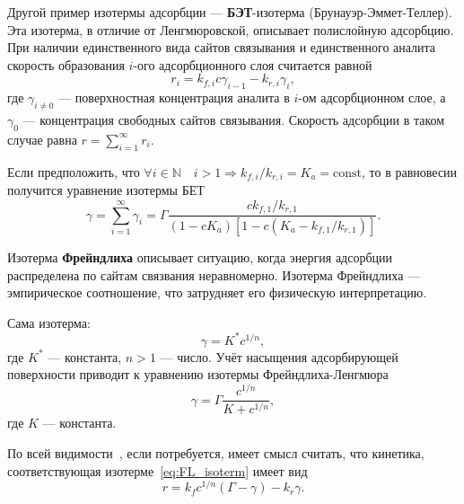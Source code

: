 \documentclass[oneside,final,12pt]{extreport}
\begin{document}

Другой пример изотермы адсорбции ---
\textbf{БЭТ}-изотерма (Брунауэр-Эммет-Теллер).
Эта изотерма, в отличие от Ленгмюровской, описывает полислойную адсорбцию.
При наличии единственного вида сайтов связывания и единственного аналита
скорость образования $i$-ого адсорбционного слоя считается равной
\begin{equation}
  r_i = k_{f,i} c \gamma_{i-1} - k_{r,i} \gamma_{i},
\label{eq:BET_ith_layer_deriv}
\end{equation}
где $\gamma_{i \neq 0}$ --- поверхностная концентрация аналита в
$i$-ом адсорбционном слое, а
$\gamma_0$ --- концентрация свободных сайтов связывания.
Скорость адсорбции в таком случае равна $r = \sum_{i=1}^{\infty} r_i$.

Если предположить, что
$\forall i \in \mathbb{N} \quad i > 1 \Rightarrow
k_{f,i}/k_{r,i} = K_a = \text{const}$,
то в равновесии получится уравнение изотермы БЕТ
\begin{equation}
  \gamma = \sum_{i=1}^{\infty}\gamma_i =
    \Gamma\frac{ck_{f,1}/k_{r,1}}
               {\left(1 - cK_a\right)
                \left[1 - c\left(K_a - k_{f,1}/k_{r,1}\right)\right]}.
\label{eq:BET_isotherm}
\end{equation}

Изотерма \textbf{Фрейндлиха} описывает ситуацию,
когда энергия адсорбции распределена по сайтам связвания неравномерно.
Изотерма Фрейндлиха --- эмпирическое соотношение,
что затрудняет его физическую интерпретацию.

Сама изотерма:
\begin{equation}
  \gamma = K^*c^{1/n},
\label{eq:pure_Freundlich_isoterm}
\end{equation}
где $K^*$ --- константа, $n>1$ --- число.
Учёт насыщения адсорбирующей поверхности приводит к
уравнению изотермы Фрейндлиха-Ленгмюра
\begin{equation}
  \gamma = \Gamma\frac{c^{1/n}}{K + c^{1/n}},
\label{eq:FL_isoterm}
\end{equation}
где $K$ --- константа.

По всей видимости~\cite{bib:freundlich_kinetics},
если потребуется, имеет смысл считать, что
кинетика, соответствующая изотерме~\eqref{eq:FL_isoterm} имеет вид
\begin{equation}
  r = k_f c^{1/n} (\Gamma - \gamma) - k_r \gamma.
\label{eq:FL_kinetics}
\end{equation}
\end{document}
